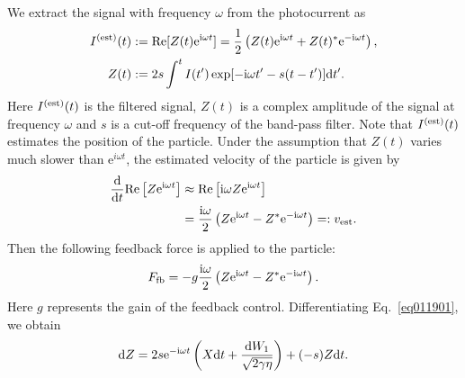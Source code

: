 \documentclass[aps,pra,superscriptaddress,twocolumn
]{revtex4-2}
\newcommand{\e}{\mathrm{e}}
\renewcommand{\i}{\mathrm{i}}
\renewcommand{\d}{{\rm d}}
\begin{document}
 We extract the signal with frequency $\omega$ from the photocurrent as 
 \begin{alignat}{1}
  I^{\rm (est)}(t) &:= {\rm Re} [Z(t) \e^{\i\omega t}] 
  = \frac{1}{2}\left(Z(t) \e^{\i\omega t} + Z(t)^* \e^{-\i\omega t}\right), \\
  Z(t) &:= 2s \int^t I(t') \exp[-\i\omega t' -s(t-t')] \d t' . \label{eq011901}
 \end{alignat}
 Here $I^{\rm (est)}(t)$ is the filtered signal,
 $Z(t)$ is a complex amplitude of the signal at frequency $\omega$
 and $s$ is a cut-off frequency of the band-pass filter.
 Note that $I^{\rm (est)}(t)$ estimates the position of the particle.
 Under the assumption that $Z(t)$ varies much slower than $\e^{i\omega t}$,
 the estimated velocity of the particle is given by
 \begin{alignat}{1}
  \frac{\d}{\d t}{\rm Re} \left[Z\e^{\i\omega t}\right] 
   &\approx {\rm Re} \left[\i\omega Z\e^{\i\omega t}\right] \notag \\
  &= \frac{\i\omega}{2}\left(Z \e^{\i\omega t} - Z^* \e^{-\i\omega t}\right) 
  =: v_{\rm est}.
 \end{alignat}
 Then the following feedback force is applied to the particle:
 \begin{equation}
  F_{\rm fb} =  
  -g\frac{\i\omega}{2}\left(Z \e^{\i\omega t} - Z^* \e^{-\i\omega t}\right). \label{eq:032606}
 \end{equation}
 Here $g$ represents the gain of the feedback control.
 Differentiating Eq.~\eqref{eq011901}, we obtain 
 \begin{equation}
  \d Z = 2s \e^{-\i\omega t} \left(X \d t + \frac{\d W_1}{\sqrt{2\gamma\eta}}\right) 
  + (-s) Z \d  t.\label{eq:032607}
 \end{equation}
 
\end{document}
